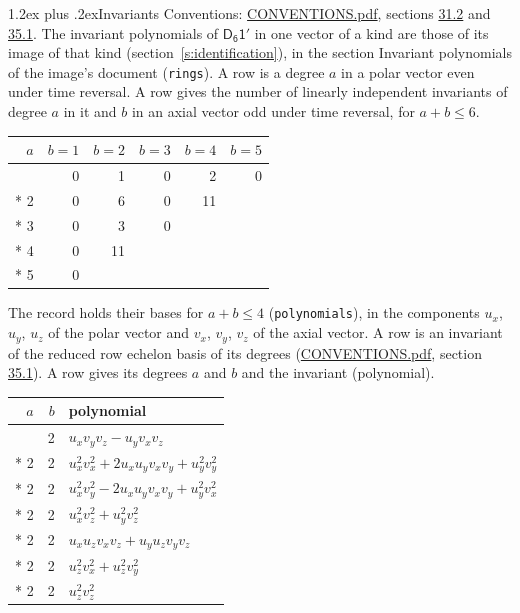 \documentclass[10pt,a4paper]{article}
\makeatletter
\renewcommand\section{\@startsection{section}{1}{\z@}{-3ex plus -1ex minus -.2ex}%
  {1.2ex plus .2ex}{\normalfont\large\sffamily\bfseries\color{parttitle}}}
\numberwithin{equation}{section}
\newcommand{\grp}[1]{\mathsf{#1}}
\makeatother
\begin{document}
\section{Invariants}\label{s:invariants}
Conventions: \href{../../CONVENTIONS.pdf}{CONVENTIONS.pdf}, sections \href{../../CONVENTIONS.pdf\#conv.31.2}{31.2} and \href{../../CONVENTIONS.pdf\#conv.35.1}{35.1}.
The invariant polynomials of $\grp{D_{6}1'}$ in one vector of a kind are those of its image of that kind (section~\ref{s:identification}), in the section Invariant polynomials of the image's document (\texttt{rings}).
\leavevmode\label{n:index.degree.polar}\label{n:index.degree.axial}A row is a degree $a$ in a polar vector even under time reversal. A row gives the number of linearly independent invariants of degree $a$ in it and $b$ in an axial vector odd under time reversal, for $a + b \le 6$.
{\small\begin{longtable}{@{}rrrrrr@{}}\toprule
$a$ & $b = 1$ & $b = 2$ & $b = 3$ & $b = 4$ & $b = 5$\\\midrule\endhead
\bottomrule\endfoot\endlastfoot
1 & 0 & 1 & 0 & 2 & 0\\*
2 & 0 & 6 & 0 & 11 & \\*
3 & 0 & 3 & 0 &  & \\*
4 & 0 & 11 &  &  & \\*
5 & 0 &  &  &  & \\
\bottomrule\end{longtable}}
\leavevmode\label{n:local.component.polar}\label{n:local.component.axial}The record holds their bases for $a + b \le 4$ (\texttt{polynomials}), in the components $u_{x}$, $u_{y}$, $u_{z}$ of the polar vector and $v_{x}$, $v_{y}$, $v_{z}$ of the axial vector. \label{n:head.polynomial}A row is an invariant of the reduced row echelon basis of its degrees (\href{../../CONVENTIONS.pdf}{CONVENTIONS.pdf}, section \href{../../CONVENTIONS.pdf\#conv.35.1}{35.1}). A row gives its degrees $a$ and $b$ and the invariant (polynomial).
{\small\renewcommand{\arraystretch}{1.2}\begin{longtable}{@{}rrl@{}}\toprule
$a$ & $b$ & polynomial\\\midrule\endhead
\bottomrule\endfoot\endlastfoot
1 & 2 & $u_{x}v_{y}v_{z} - u_{y}v_{x}v_{z}$\\*
2 & 2 & $u_{x}^{2}v_{x}^{2} + 2u_{x}u_{y}v_{x}v_{y} + u_{y}^{2}v_{y}^{2}$\\*
2 & 2 & $u_{x}^{2}v_{y}^{2} - 2u_{x}u_{y}v_{x}v_{y} + u_{y}^{2}v_{x}^{2}$\\*
2 & 2 & $u_{x}^{2}v_{z}^{2} + u_{y}^{2}v_{z}^{2}$\\*
2 & 2 & $u_{x}u_{z}v_{x}v_{z} + u_{y}u_{z}v_{y}v_{z}$\\*
2 & 2 & $u_{z}^{2}v_{x}^{2} + u_{z}^{2}v_{y}^{2}$\\*
2 & 2 & $u_{z}^{2}v_{z}^{2}$\\
\bottomrule\end{longtable}}
\end{document}
